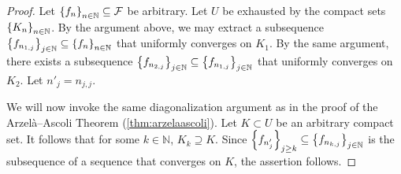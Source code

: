 \begin{proof}
    Let \(\cbraces{f_n}_{n\in\mathbb{N}}\subseteq\mathcal{F}\) be arbitrary. Let \(U\) be exhausted by the compact sets \(\cbraces{K_n}_{n\in\mathbb{N}}\). By the argument above, we may extract a subsequence \(\cbraces{f_{n_{1,j}}}_{j\in\mathbb{N}}\subseteq \cbraces{f_n}_{n\in\mathbb{N}}\) that uniformly converges on \(K_1\). By the same argument, there exists a subsequence \(\cbraces{f_{n_{2,j}}}_{j\in\mathbb{N}}\subseteq\cbraces{f_{n_{1,j}}}_{j\in\mathbb{N}}\) that uniformly converges on \(K_2\). Let \(n'_j=n_{j,j}\).

    We will now invoke the same diagonalization argument as in the proof of the Arzelà--Ascoli Theorem (\cref{thm:arzelaascoli}). Let \(K\subset U\) be an arbitrary compact set. It follows that for some \(k\in\mathbb{N}\), \(K_k\supseteq K\). Since \(\cbraces{f_{n'_j}}_{j\geq k}\subseteq\cbraces{f_{n_{k,j}}}_{j\in\mathbb{N}}\) is the subsequence of a sequence that converges on \(K\), the assertion follows.
\end{proof}